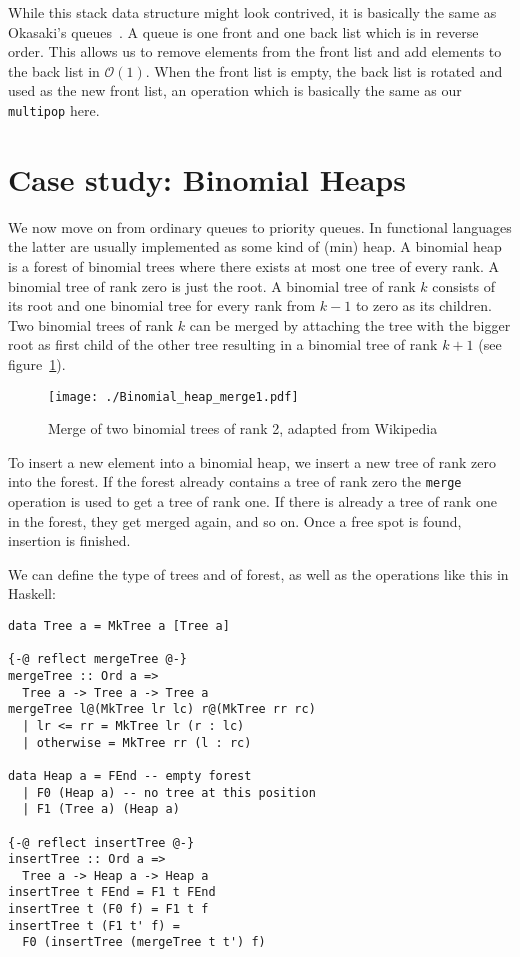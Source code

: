 \documentclass[sigplan,screen,review,anonymous]{acmart}
\renewcommand\O[1]{$\mathcal{O}(#1)$}
\begin{document}
While this stack data structure might look contrived, it is basically the same as Okasaki's queues~\cite{okasaki}. A queue is one front and one back list which is in reverse order. This allows us to remove elements from the front list and add elements to the back list in \O{1}. When the front list is empty, the back list is rotated and used as the new front list, an operation which is basically the same as our \texttt{multipop} here.

\section{Case study: Binomial Heaps}\label{sec:binomal_heap}

We now move on from ordinary queues to priority queues. In functional languages the latter are usually implemented as some kind of (min) heap. A binomial heap is a forest of binomial trees where there exists at most one tree of every rank. A binomial tree of rank zero is just the root. A binomial tree of rank $k$ consists of its root and one binomial tree for every rank from $k - 1$ to zero as its children. Two binomial trees of rank $k$ can be merged by attaching the tree with the bigger root as first child of the other tree resulting in a binomial tree of rank $k + 1$ (see figure~\ref{fig:heap_merge}).

\begin{figure}
\texttt{[image: ./Binomial\_heap\_merge1.pdf]}
\caption{Merge of two binomial trees of rank 2, adapted from Wikipedia~\cite{heap_merge}}\label{fig:heap_merge}
\end{figure}

To insert a new element into a binomial heap, we insert a new tree of rank zero into the forest. If the forest already contains a tree of rank zero the \texttt{merge} operation is used to get a tree of rank one. If there is already a tree of rank one in the forest, they get merged again, and so on. Once a free spot is found, insertion is finished.

We can define the type of trees and of forest, as well as the operations like this in Haskell:

\noindent
\begin{minipage}{\linewidth}
\begin{lstlisting}
data Tree a = MkTree a [Tree a]

{-@ reflect mergeTree @-}
mergeTree :: Ord a =>
  Tree a -> Tree a -> Tree a
mergeTree l@(MkTree lr lc) r@(MkTree rr rc)
  | lr <= rr = MkTree lr (r : lc)
  | otherwise = MkTree rr (l : rc)

data Heap a = FEnd -- empty forest
  | F0 (Heap a) -- no tree at this position
  | F1 (Tree a) (Heap a)

{-@ reflect insertTree @-}
insertTree :: Ord a =>
  Tree a -> Heap a -> Heap a
insertTree t FEnd = F1 t FEnd
insertTree t (F0 f) = F1 t f
insertTree t (F1 t' f) =
  F0 (insertTree (mergeTree t t') f)

\end{lstlisting}
\end{minipage}
\end{document}
